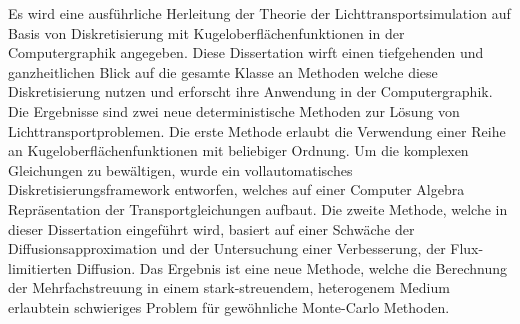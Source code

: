 Es wird eine ausführliche Herleitung der Theorie der Lichttransportsimulation auf Basis von Diskretisierung mit Kugeloberflächenfunktionen in der Computergraphik angegeben. Diese Dissertation wirft einen tiefgehenden und ganzheitlichen Blick auf die gesamte Klasse an Methoden welche diese Diskretisierung nutzen und erforscht ihre Anwendung in der Computergraphik. Die Ergebnisse sind zwei neue deterministische Methoden zur Lösung von Lichttransportproblemen. Die erste Methode erlaubt die Verwendung einer Reihe an Kugeloberflächenfunktionen mit beliebiger Ordnung. Um die komplexen Gleichungen zu bewältigen, wurde ein vollautomatisches Diskretisierungsframework entworfen, welches auf einer Computer Algebra Repräsentation der Transportgleichungen aufbaut. Die zweite Methode, welche in dieser Dissertation eingeführt wird, basiert auf einer Schwäche der Diffusionsapproximation und der Untersuchung einer Verbesserung, der Flux-limitierten Diffusion. Das Ergebnis ist eine neue Methode, welche die Berechnung der Mehrfachstreuung in einem stark-streuendem, heterogenem Medium erlaubt\mydash ein schwieriges Problem für gewöhnliche Monte-Carlo Methoden.
%
